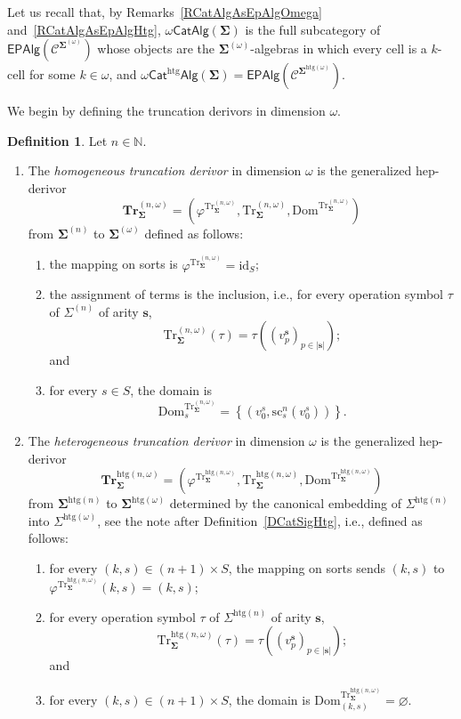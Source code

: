 \documentclass[a4paper, reqno]{amsbook}
\newcommand{\bb}[1]{\ensuremath{\lvert #1 \rvert}}
\newcommand{\sig}[1]{\mathbf{#1}}             %
\newcommand{\spec}[1]{\boldsymbol{\mathcal{#1}}} %
\newcommand{\Dom}{\mathrm{Dom}}
\newcommand{\htg}{\mathrm{htg}}                %
\newcommand{\id}{\mathrm{id}}
\newcommand{\src}{\mathrm{sc}}
\newcommand{\Tr}{\mathrm{Tr}}
\newcommand{\bTr}{\mathbf{Tr}}
\theoremstyle{plain}
\theoremstyle{definition}
\newtheorem{definition}[theorem]{Definition}
\begin{document}
Let us recall that, by Remarks~\ref{RCatAlgAsEpAlgOmega} and~\ref{RCatAlgAsEpAlgHtg}, $\omega\mathsf{CatAlg}(\sig{\Sigma})$ is the full subcategory of $\mathsf{EPAlg}(\spec{C}^{\sig{\Sigma}^{(\omega)}})$ whose objects are the $\sig{\Sigma}^{(\omega)}$-algebras in which every cell is a $k$-cell for some $k\in\omega$, and $\omega\mathsf{Cat}^{\htg}\mathsf{Alg}(\sig{\Sigma})=\mathsf{EPAlg}(\spec{C}^{\sig{\Sigma}^{\htg(\omega)}})$.

We begin by defining the truncation derivors in dimension $\omega$.

\begin{definition}\label{DTrDerivorOmega}
Let $n\in\mathbb{N}$.
\begin{enumerate}
\item The \emph{homogeneous truncation derivor} in dimension $\omega$ is the generalized hep-derivor
$$
\bTr^{(n,\omega)}_{\sig{\Sigma}}=\left(\varphi^{\Tr^{(n,\omega)}_{\sig{\Sigma}}},\Tr^{(n,\omega)}_{\sig{\Sigma}},\Dom^{\Tr^{(n,\omega)}_{\sig{\Sigma}}}\right)
$$
from $\sig{\Sigma}^{(n)}$ to $\sig{\Sigma}^{(\omega)}$ defined as follows:
\begin{enumerate}
\item the mapping on sorts is $\varphi^{\Tr^{(n,\omega)}_{\sig{\Sigma}}}=\id_{S}$;
\item the assignment of terms is the inclusion, i.e., for every operation symbol $\tau$ of $\Sigma^{(n)}$ of arity $\mathbf{s}$,
$$
\Tr^{(n,\omega)}_{\sig{\Sigma}}(\tau)=\tau((v^{\mathbf{s}}_{p})_{p\in\bb{\mathbf{s}}});
$$
and
\item for every $s\in S$, the domain is
$$
\Dom^{\Tr^{(n,\omega)}_{\sig{\Sigma}}}_{s}=\left\lbrace\left(v^{s}_{0},\src^{n}_{s}(v^{s}_{0})\right)\right\rbrace.
$$
\end{enumerate}
\item The \emph{heterogeneous truncation derivor} in dimension $\omega$ is the generalized hep-derivor
$$
\bTr^{\htg(n,\omega)}_{\sig{\Sigma}}=\left(\varphi^{\Tr^{\htg(n,\omega)}_{\sig{\Sigma}}},\Tr^{\htg(n,\omega)}_{\sig{\Sigma}},\Dom^{\Tr^{\htg(n,\omega)}_{\sig{\Sigma}}}\right)
$$
from $\sig{\Sigma}^{\htg(n)}$ to $\sig{\Sigma}^{\htg(\omega)}$ determined by the canonical embedding of $\Sigma^{\htg(n)}$ into $\Sigma^{\htg(\omega)}$, see the note after Definition~\ref{DCatSigHtg}, i.e., defined as follows:
\begin{enumerate}
\item for every $(k,s)\in(n+1)\times S$, the mapping on sorts sends $(k,s)$ to $\varphi^{\Tr^{\htg(n,\omega)}_{\sig{\Sigma}}}(k,s)=(k,s)$;
\item for every operation symbol $\tau$ of $\Sigma^{\htg(n)}$ of arity $\mathbf{s}$,
$$
\Tr^{\htg(n,\omega)}_{\sig{\Sigma}}(\tau)=\tau((v^{\mathbf{s}}_{p})_{p\in\bb{\mathbf{s}}});
$$
and
\item for every $(k,s)\in(n+1)\times S$, the domain is $\Dom^{\Tr^{\htg(n,\omega)}_{\sig{\Sigma}}}_{(k,s)}=\varnothing$.
\end{enumerate}
\end{enumerate}
\end{definition}
\end{document}
